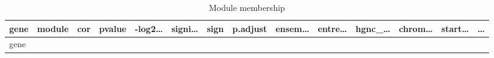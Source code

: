 \documentclass[
]{article}
\begin{document}
\begin{longtable}[]{@{}llllllllllllll@{}}
\caption{\label{tab:module-membership}Module membership}\tabularnewline
\toprule
\begin{minipage}[b]{0.05\columnwidth}\raggedright
gene\strut
\end{minipage} & \begin{minipage}[b]{0.04\columnwidth}\raggedright
module\strut
\end{minipage} & \begin{minipage}[b]{0.04\columnwidth}\raggedright
cor\strut
\end{minipage} & \begin{minipage}[b]{0.04\columnwidth}\raggedright
pvalue\strut
\end{minipage} & \begin{minipage}[b]{0.05\columnwidth}\raggedright
-log2\ldots{}\strut
\end{minipage} & \begin{minipage}[b]{0.05\columnwidth}\raggedright
signi\ldots{}\strut
\end{minipage} & \begin{minipage}[b]{0.03\columnwidth}\raggedright
sign\strut
\end{minipage} & \begin{minipage}[b]{0.05\columnwidth}\raggedright
p.adjust\strut
\end{minipage} & \begin{minipage}[b]{0.05\columnwidth}\raggedright
ensem\ldots{}\strut
\end{minipage} & \begin{minipage}[b]{0.05\columnwidth}\raggedright
entre\ldots{}\strut
\end{minipage} & \begin{minipage}[b]{0.05\columnwidth}\raggedright
hgnc\_\ldots{}\strut
\end{minipage} & \begin{minipage}[b]{0.05\columnwidth}\raggedright
chrom\ldots{}\strut
\end{minipage} & \begin{minipage}[b]{0.05\columnwidth}\raggedright
start\ldots{}\strut
\end{minipage} & \begin{minipage}[b]{0.02\columnwidth}\raggedright
\ldots{}\strut
\end{minipage}\tabularnewline
\midrule
\endfirsthead
\toprule
\begin{minipage}[b]{0.05\columnwidth}\raggedright
gene\strut
\end{minipage} & \begin{minipage}[b]{0.04\columnwidth}\raggedright

\end{minipage}
\end{longtable}
\end{document}
